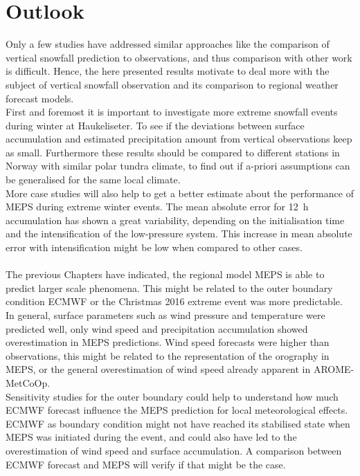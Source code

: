 \section{Outlook}
Only a few studies have addressed similar approaches like the comparison of vertical snowfall prediction to observations, and thus comparison with other work is difficult. Hence, the here presented results motivate to deal more with the subject of vertical snowfall observation and its comparison to regional weather forecast models. 
\\
First and foremost it is important to investigate more extreme snowfall events during winter at Haukeliseter. To see if the deviations between surface accumulation and estimated precipitation amount from vertical observations keep as small. Furthermore these results should be compared to different stations in Norway with similar polar tundra climate, to find out if a-priori assumptions can be generalised for the same local climate. 
\\
More case studies will also help to get a better estimate about the performance of MEPS during extreme winter events. 
The mean absolute error for \SI{12}{\hour} accumulation has shown a great variability, depending on the initialisation time and the intensification of the low-pressure system. This increase in mean absolute error with intensification might be low when compared to other cases. 
\\
\\
The previous Chapters have indicated, the regional model MEPS is able to predict larger scale phenomena. This might be related to the outer boundary condition ECMWF or the Christmas 2016 extreme event was more predictable. In general, surface parameters such as wind pressure and temperature were predicted well, only wind speed and precipitation accumulation showed overestimation in MEPS predictions. Wind speed forecasts were higher than observations, this might be related to the representation of the orography in MEPS, or the general overestimation of wind speed already apparent in AROME-MetCoOp.
\\
Sensitivity studies for the outer boundary could help to understand how much ECMWF forecast influence the MEPS prediction for local meteorological effects. ECMWF as boundary condition might not have reached its stabilised state when MEPS was initiated during the event, and could also have led to the overestimation of wind speed and surface accumulation. A comparison between ECMWF forecast and MEPS will verify if that might be the case.
